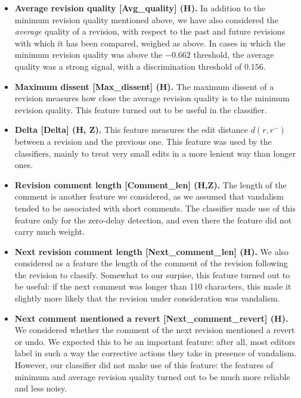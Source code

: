 \begin{itemize}
\item \textbf{Average revision quality [Avg\_quality] (H).} In addition to the minimum revision quality mentioned above, we have also considered the {\em average\/} quality of a revision, with respect to the past and future revisions with which it has been compared, weighed as above.
In cases in which the minimum revision quality was above the $-0.662$ threshold, the average quality was a strong signal, with a discrimination threshold of $0.156$.

\item \textbf{Maximum dissent [Max\_dissent] (H).}  The maximum dissent of a revision measures how close the average revision quality is to the minimum revision quality.
This feature turned out to be useful in the classifier.

\item \textbf{Delta [Delta] (H, Z).}  This feature measures the edit distance $d(r, r^{-})$ between a revision and the previous one.  This feature was used by the classifiers, mainly to treat very small edits in a more lenient way than longer ones.

\item \textbf{Revision comment length [Comment\_len] (H,Z).}  The length of the comment is another feature we considered, as we assumed that vandalism tended to be associated with short comments.
The classifier made use of this feature only for the zero-delay detection, and even there the feature did not carry much weight.

\item \textbf{Next revision comment length [Next\_comment\_len] (H).}  We also considered as a feature the length of the comment of the revision following the revision to classify.
Somewhat to our surpise, this feature turned out to be useful: if the next comment was longer than 110 characters, this made it slightly more likely that the revision under consideration was vandalism.

\item \textbf{Next comment mentioned a revert [Next\_comment\_revert] (H).}  We considered whether the comment of the next revision mentioned a revert or undo.  We expected this to be an important feature: after all, most editors label in such a way the corrective actions they take in presence of vandalism.  However, our classifier did not make use of this feature: the features of minimum and average revision quality turned out to be much more reliable and less noisy.


\end{itemize}
